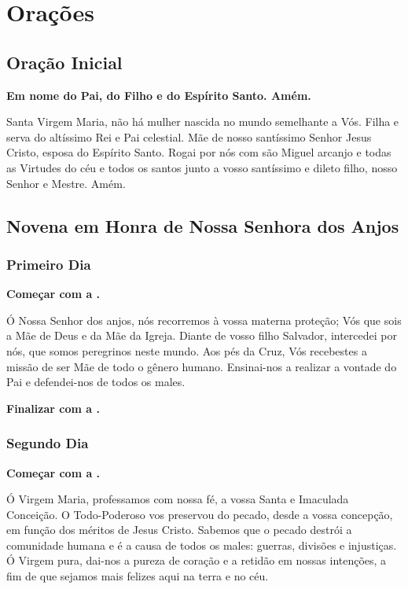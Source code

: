 \documentclass[a4paper,12pt]{extarticle} \usepackage[utf8]{inputenc}
\begin{document}
\newpage
\section{Orações}

\subsection{Oração Inicial} \label{oracao-inicial}

\textbf{Em nome do Pai, do Filho e do Espírito Santo. Amém.}

Santa Virgem Maria, não há mulher nascida no mundo semelhante a Vós. Filha e serva do altíssimo Rei e Pai celestial. Mãe de nosso santíssimo Senhor Jesus Cristo, esposa do Espírito Santo. Rogai por nós com são Miguel arcanjo e todas as Virtudes do céu e todos os santos junto a vosso santíssimo e dileto filho, nosso Senhor e Mestre. Amém.


\subsection{Novena em Honra de Nossa Senhora dos Anjos}

\subsubsection{Primeiro Dia}

\noindent

\textbf{Começar com a .}

Ó Nossa Senhor dos anjos, nós recorremos à vossa materna proteção; Vós que sois a Mãe de Deus e da Mãe da Igreja. Diante de vosso filho Salvador, intercedei por nós, que somos peregrinos neste mundo. Aos pés da Cruz, Vós recebestes a missão de ser Mãe de todo o gênero humano. Ensinai-nos a realizar a vontade do Pai e defendei-nos de todos os males.

\textbf{Finalizar com a .}


\subsubsection{Segundo Dia}

\textbf{Começar com a .}

Ó Virgem Maria, professamos com nossa fé, a vossa Santa e Imaculada Conceição. O Todo-Poderoso vos preservou do pecado, desde a vossa concepção, em função dos méritos de Jesus Cristo. Sabemos que o pecado destrói a comunidade humana e é a causa de todos os males: guerras, divisões e injustiças. Ó Virgem pura, dai-nos a pureza de coração e a retidão em nossas intenções, a fim de que sejamos mais felizes aqui na terra e no céu.
\end{document}
